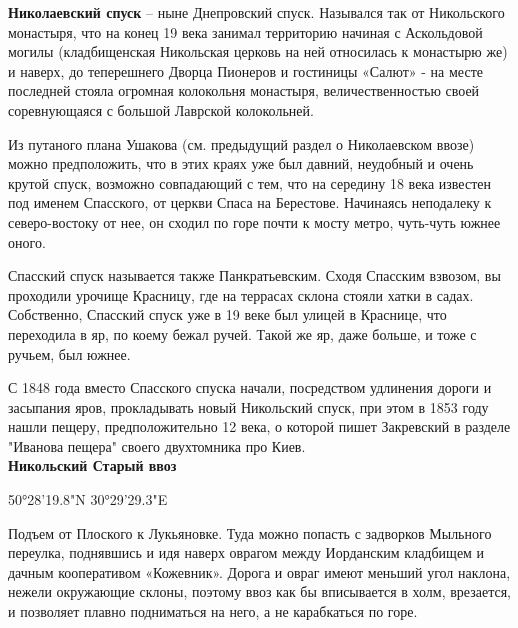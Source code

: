 




\textbf{Николаевский спуск} – ныне Днепровский спуск. Назывался так от Никольского монастыря, что на конец 19 века занимал территорию начиная с Аскольдовой могилы (кладбищенская Никольская церковь на ней относилась к монастырю же) и наверх, до теперешнего Дворца Пионеров и гостиницы «Салют» - на месте последней стояла огромная колокольня монастыря, величественностью своей соревнующаяся с большой Лаврской колокольней.

Из путаного плана Ушакова (см. предыдущий раздел о Николаевском ввозе) можно предположить, что в этих краях уже был давний, неудобный и очень крутой спуск, возможно совпадающий с тем, что на середину 18 века известен под именем Спасского, от церкви Спаса на Берестове. Начинаясь неподалеку к северо-востоку от нее, он сходил по горе почти к мосту метро, чуть-чуть южнее оного. 

Спасский спуск называется также Панкратьевским. Сходя Спасским взвозом, вы проходили урочище Красницу, где на террасах склона стояли хатки в садах. Собственно, Спасский спуск уже в 19 веке был улицей в Краснице, что переходила в яр, по коему бежал ручей. Такой же яр, даже больше, и тоже с ручьем, был южнее.

С 1848 года вместо Спасского спуска начали, посредством удлинения дороги и засыпания яров, прокладывать новый Никольский спуск, при этом в 1853 году нашли пещеру, предположительно 12 века, о которой пишет Закревский в разделе "Иванова пещера" своего двухтомника про Киев.\\

\textbf{Никольский Старый ввоз} 

50°28'19.8"N 30°29'29.3"E

Подъем от Плоского к Лукьяновке. Туда можно попасть с задворков Мыльного переулка, поднявшись и идя наверх оврагом между Иорданским кладбищем и дачным кооперативом «Кожевник». Дорога и овраг имеют меньший угол наклона, нежели окружающие склоны, поэтому ввоз как бы вписывается в холм, врезается, и позволяет плавно подниматься на него, а не карабкаться по горе.

